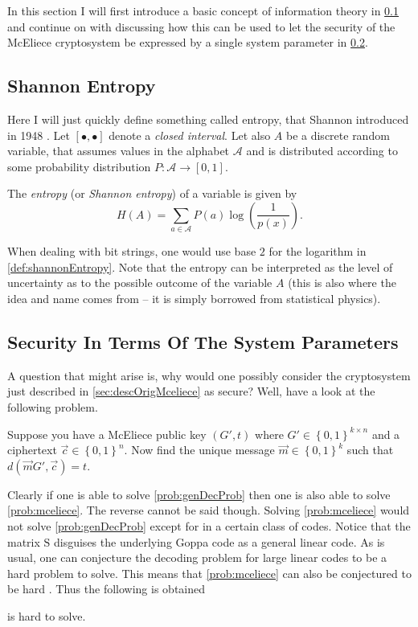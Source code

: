 In this section I will first introduce a basic concept of information theory in \cref{subsec:ShaEnt} and continue on with discussing how this can be used to let the security of the McEliece cryptosystem be expressed by a single system parameter in \cref{subsec:secTerSysPar}.


\subsection{Shannon Entropy}
\label{subsec:ShaEnt}

Here I will just quickly define something called entropy, that Shannon introduced in 1948 \cite{shannon}. Let $\left[ \bullet , \bullet \right]$ denote a \emph{closed interval}. Let also $A$ be a discrete random variable, that assumes values in the alphabet $\mathcal{A}$ and is distributed according to some probability distribution $P: \mathcal{A} \rightarrow \left[0,1\right]$.
\begin{defi}
\label{def:shannonEntropy}
	The \emph{entropy} (or \emph{Shannon entropy}) of a variable is given by
	\[
		H\left(A\right) = \sum\limits_{a \in \mathcal{A}} P\left(a\right) \log \left( \frac{1}{p\left(x\right)} \right).
	\]
\end{defi}
When dealing with bit strings, one would use base $2$ for the logarithm in \cref{def:shannonEntropy}. Note that the entropy can be interpreted as the level of uncertainty as to the possible outcome of the variable $A$ (this is also where the idea and name comes from -- it is simply borrowed from statistical physics).


\subsection{Security In Terms Of The System Parameters}
\label{subsec:secTerSysPar}

A question that might arise is, why would one possibly consider the cryptosystem just described in \cref{sec:descOrigMceliece} as secure? Well, have a look at the following problem.
\begin{prob}
\label{prob:mceliece}
	Suppose you have a McEliece public key $\left(G',t\right)$ where $G' \in \left\{ 0, 1 \right\} ^{k \times n}$ and a ciphertext $\vec{c} \in \left\{ 0,1 \right\} ^n$. Now find the unique message $\vec{m} \in \left\{ 0,1 \right\}^k$ such that $d\left(\vec{m}G', \vec{c}\right) = t$.
\end{prob}

Clearly if one is able to solve \cref{prob:genDecProb} then one is also able to solve \cref{prob:mceliece}. The reverse cannot be said though. Solving \cref{prob:mceliece} would not solve \cref{prob:genDecProb} except for in a certain class of codes. Notice that the matrix $\mathrm{S}$ disguises the underlying Goppa code as a general linear code. As is usual, one can conjecture the decoding problem for large linear codes to be a hard problem to solve. This means that \cref{prob:mceliece} can also be conjectured to be hard \cite{NMBB,KI,EOS}. Thus the following is obtained
\begin{conj}
\label{conj:McEProbIsHard}
	 is hard to solve.
\end{conj}


